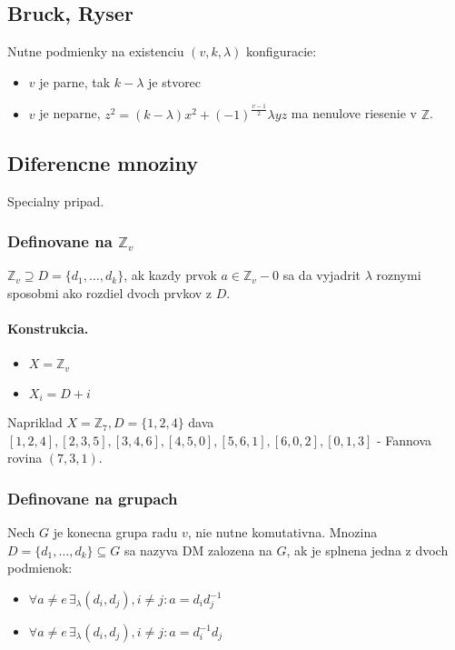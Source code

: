 \documentclass[10pt,a4paper]{article}
\begin{document}
\subsection{Bruck, Ryser}
Nutne podmienky na existenciu $(v,k,\lambda)$ konfiguracie:

\begin{itemize}
\item $v$ je parne, tak $k-\lambda$ je stvorec
\item $v$ je neparne, $z^2 = (k-\lambda)x^2 + (-1)^{\frac{v-1}{2}}\lambda yz$ ma nenulove riesenie v $\mathbb{Z}$. 
\end{itemize}

\subsection{Diferencne mnoziny}
Specialny pripad. 

\subsubsection{Definovane na $\mathbb{Z}_v$}
$\mathbb{Z}_v \supseteq D = \{d_1, \ldots, d_k\}$, ak kazdy prvok $a \in \mathbb{Z}_v - {0}$ sa da vyjadrit $\lambda$ roznymi sposobmi ako rozdiel dvoch prvkov z $D$. 
\paragraph{Konstrukcia.}
\begin{itemize}
\item $X=\mathbb{Z}_v$
\item $X_i = D + i$
\end{itemize}
Napriklad $X=\mathbb{Z}_7, D=\{1,2,4\}$ dava $[1,2,4],[2,3,5],[3,4,6],[4,5,0],[5,6,1],[6,0,2],[0,1,3]$ - Fannova rovina $(7,3,1)$. 

\subsubsection{Definovane na grupach}
Nech $G$ je konecna grupa radu $v$, nie nutne komutativna. Mnozina $D = \{d_1, \ldots, d_k\} \subseteq G$ sa nazyva DM zalozena na $G$, ak je splnena jedna z dvoch podmienok: 

\begin{itemize}
\item $\forall a \neq e \, \exists_\lambda (d_i, d_j), i\neq j : a = d_id_j^{-1}$
\item $\forall a \neq e \, \exists_\lambda (d_i, d_j), i\neq j : a = d_i^{-1}d_j$
\end{itemize}
\end{document}
